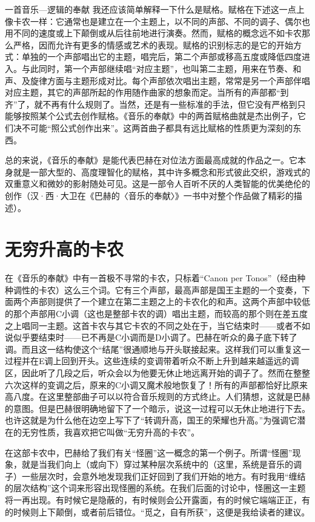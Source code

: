\begin{intro}{一首音乐—逻辑的奉献}
我还应该简单解释一下什么是赋格。赋格在下述这一点上像卡农一样：它通常也是建立在一个主题上，以不同的声部、不同的调子、偶尔也用不同的速度或上下颠倒或从后往前地进行演奏。然而，赋格的概念远不如卡农那么严格，因而允许有更多的情感或艺术的表现。赋格的识别标志的是它的开始方式：单独的一个声部唱出它的主题，唱完后，第二个声部或移高五度或降低四度进入。与此同时，第一个声部继续唱“对应主题”，也叫第二主题，用来在节奏、和声、及旋律方面与主题形成对比。每个声部依次唱出主题，常常是另一个声部伴唱对应主题，其它的声部所起的作用随作曲家的想象而定。当所有的声部都“到齐”了，就不再有什么规则了。当然，还是有一些标准的手法，但它没有严格到只能够按照某个公式去创作赋格。《音乐的奉献》中的两首赋格曲就是杰出例子，它们决不可能“照公式创作出来”。这两首曲子都具有远比赋格的性质更为深刻的东西。

总的来说，《音乐的奉献》是能代表巴赫在对位法方面最高成就的作品之一。它本身就是一部大型的、高度理智化的赋格，其中许多概念和形式彼此交织，游戏式的双重意义和微妙的影射随处可见。这是一部令人百听不厌的人类智能的优美绝伦的创作（汉·西·大卫在《巴赫的〈音乐的奉献〉》一书中对整个作品做了精彩的描述）。

\section{无穷升高的卡农}

在《音乐的奉献》中有一首极不寻常的卡农，只标着“Canon per Tonos”（经由种种调性的卡农）这么三个词。它有三个声部，最高声部是国王主题的一个变奏，下面两个声部则提供了一个建立在第二主题之上的卡农化的和声。这两个声部中较低的那个声部用C小调（这也是整部卡农的调）唱出主题，而较高的那个则在差五度之上唱同一主题。这首卡农与其它卡农的不同之处在于，当它结束时——或者不如说似乎要结束时——已不再是C小调而是D小调了。巴赫在听众的鼻子底下转了调。而且这一结构使这个“结尾”很通顺地与开头联接起来。这样我们可以重复这一过程并在E调上回到开头。这些连续的变调带着听众不断上升到越来越遥远的调区，因此听了几段之后，听众会以为他要无休止地远离开始的调子了。然而在整整六次这样的变调之后，原来的C小调又魔术般地恢复了！所有的声部都恰好比原来高八度。在这里整部曲子可以以符合音乐规则的方式终止。人们猜想，这就是巴赫的意图。但是巴赫很明确地留下了一个暗示，说这一过程可以无休止地进行下去。也许这就是为什么他在边空上写下了“转调升高，国王的荣耀也升高。”为强调它潜在的无穷性质，我喜欢把它叫做“无穷升高的卡农”。

在这部卡农中，巴赫给了我们有关“怪圈”这一概念的第一个例子。所谓“怪圈”现象，就是当我们向上（或向下）穿过某种层次系统中的（这里，系统是音乐的调子）一些层次时，会意外地发现我们正好回到了我们开始的地方。有时我用“缠结的层次结构”这个词来形容出现怪圈的系统。在我们后面的讨论中，怪圈这一主题将一再出现。有时候它是隐蔽的，有时候则会公开露面，有的时候它端端正正，有的时候则上下颠倒，或者前后错位。“觅之，自有所获”，这便是我给读者的建议。


\end{intro}
